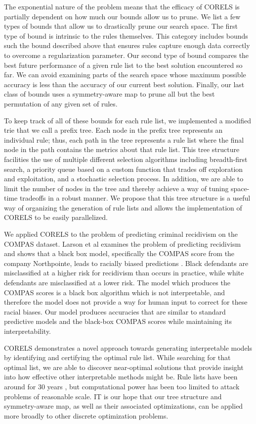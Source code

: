 \documentclass[]{report}
\theoremstyle{definition}
\begin{document}
The exponential nature of the problem means that the efficacy of CORELS is partially dependent on how much our bounds allow us to prune. 
We list a few types of bounds that allow us to drastically prune our search space. 
The first type of bound is intrinsic to the rules themselves.
This category includes bounds such the bound described above that ensures rules capture enough data correctly to overcome a regularization parameter. 
Our second type of bound compares the best future performance of a given rule list to the best solution encountered so far. 
We can avoid examining parts of the search space whose maximum possible accuracy is less than the accuracy of our current best solution. 
Finally, our last class of bounds uses a symmetry-aware map to prune all but the best permutation of any given set of rules.

To keep track of all of these bounds for each rule list, we implemented a modified trie that we call a prefix tree. 
Each node in the prefix tree represents an individual rule; thus, each path in the tree represents a rule list where the final node in the path contains the metrics about that rule list.
This tree structure facilities the use of multiple different selection algorithms including breadth-first search, a priority queue based on a custom function that trades off exploration and exploitation, and a stochastic selection process. 
In addition, we are able to limit the number of nodes in the tree and thereby achieve a way of tuning space-time tradeoffs in a robust manner. 
We propose that this tree structure is a useful way of organizing the generation of rule lists and allows the implementation of CORELS to be easily parallelized.

We applied CORELS to the problem of predicting criminal recidivism on the COMPAS dataset.
Larson et al examines the problem of predicting recidivism and shows that a black box model, specifically the COMPAS score from the company Northpointe, leads to racially biased predictions \cite{LarsonMaKiAn16}.
Black defendants are misclassified at a higher risk for recidivism than occurs in practice, while white defendants are misclassified at a lower risk. 
The model which produces the COMPAS scores is a black box algorithm which is not interpretable, and therefore the model does not provide a way for human input to correct for these racial biases. 
Our model produces accuracies that are similar to standard predictive models and the black-box COMPAS scores while maintaining its interpretability.

CORELS demonstrates a novel approach towards generating interpretable models by identifying and certifying the optimal rule list. 
While searching for that optimal list, we are able to discover near-optimal solutions that provide insight into how effective other interpretable methods might be. 
Rule lists have been around for 30 years \cite{Rivest87}, but computational power has been too limited to attack problems of reasonable scale.
IT is our hope that our tree structure and symmetry-aware map, as well as their associated optimizations, can be applied more broadly to other discrete optimization problems.
\end{document}
